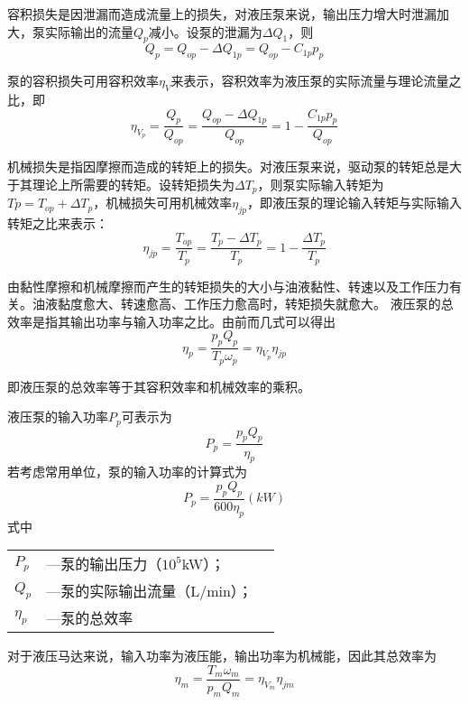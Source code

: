 容积损失是因泄漏而造成流量上的损失，对液压泵来说，输出压力增大时泄漏加大，泵实际输出的流量$Q_{p}$减小。设泵的泄漏为${\Delta  }{Q_{1}}$，则
\begin{equation}
  Q_{p}={Q_{op}}-{\Delta  Q_{1p}}={{Q_{op}}-{C_{1p}}{p_{p}}}
\end{equation}

泵的容积损失可用容积效率$\eta_{V}$来表示，容积效率为液压泵的实际流量与理论流量之比，即
\begin{equation}
  \eta _{V_{p}}=\frac{Q_{p}}{Q_{op}}=\frac{{Q_{op}-\Delta Q_{1p} }}{Q_{op}}=1-\frac{{C_{1p}}{p_{p}}}{Q_{op}}
\end{equation}

机械损失是指因摩擦而造成的转矩上的损失。对液压泵来说，驱动泵的转矩总是大于其理论上所需要的转矩。设转矩损失为$\Delta  T_{p}$，则泵实际输入转矩为$T{p}={T_{op}}+\varDelta T_{p}$，机械损失可用机械效率$\eta _{jp}$，即液压泵的理论输入转矩与实际输入转矩之比来表示：
\begin{equation}
  \eta _{jp}=\frac{T_{op}}{T_{p}}=\frac{{T_{p}-{\Delta T_{p}}}}{T_{p}}=1-\frac{\Delta T_{p}}{T_{p}}
\end{equation}

由黏性摩擦和机械摩擦而产生的转矩损失的大小与油液黏性、转速以及工作压力有关。油液黏度愈大、转速愈高、工作压力愈高时，转矩损失就愈大。
液压泵的总效率是指其输出功率与输入功率之比。由前而几式可以得出
\begin{equation}
  \eta _{p}=\frac{p_{p}Q_{p}}{T_{p}\omega_{p}}=\eta_{V_{p}}\eta_{jp}
\end{equation}

即液压泵的总效率等于其容积效率和机械效率的乘积。

液压泵的输入功率$P_{p}$可表示为
\begin{equation}
  P_{p}=\frac{p_{p}Q_{p}}{\eta_{p}}
\end{equation}
若考虑常用单位，泵的输入功率的计算式为
\begin{equation}
  P_{p}=\frac{p_{p}Q_{p}}{600\eta_{p}}(kW)
\end{equation}
\noindent 式中\
\begin{tabular}[t]{lll}
  $P_{p}$ &---泵的输出压力（$10^5$kW）；\\
  $Q_{p}$ &---泵的实际输出流量（L/min）；\\
  $\eta_{p}$ &---泵的总效率
  \end{tabular}

对于液压马达来说，输入功率为液压能，输出功率为机械能，因此其总效率为
\begin{equation}
  \eta_{m}=\frac{T_{m}\omega_{m}}{p_{m}Q_{m}}=\eta_{V_{m}}\eta_{jm}
\end{equation}

